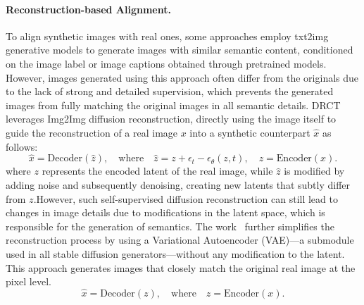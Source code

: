\documentclass{article}
\begin{document}
\paragraph{Reconstruction-based Alignment.} To align synthetic images with real ones, some approaches \cite{yu2024semgir, zhu2023genimage, guillaro2024bias} employ txt2img generative models to generate images with similar semantic content, conditioned on the image label or image captions obtained through pretrained models. However, images generated using this approach often differ from the originals due to the lack of strong and detailed supervision, which prevents the generated images from fully matching the original images in all semantic details. DRCT \cite{chen2024drct, guillaro2024bias} leverages Img2Img diffusion reconstruction, directly using the image itself to guide the reconstruction of a real image $x$ into a synthetic counterpart $\hat{x}$ as follows:
\begin{equation}
     \hat{x} = \text{Decoder} (\hat{z}), \quad \text{where} \quad \hat{z} = z + \epsilon_t - \epsilon_{\theta}(z, t), \quad z = \text{Encoder} (x) \label{eq:sd_rec}.
\end{equation}
where $z$ represents the encoded latent of the real image, while $\hat{z}$ is modified by adding noise and subsequently denoising, creating new latents that subtly differ from $z$.However, such self-supervised diffusion reconstruction can still lead to changes in image details due to modifications in the latent space, which is responsible for the generation of semantics. The work~\cite{rajan2025aligned} further simplifies the reconstruction process by using a Variational Autoencoder (VAE)—a submodule used in all stable diffusion generators—without any modification to the latent. This approach generates images that closely match the original real image at the pixel level.
\begin{equation}
    \hat{x} = \text{Decoder} (z), \quad \text{where} \quad z = \text{Encoder} (x) \label{eq:vae_rec}.
\end{equation}
\end{document}
